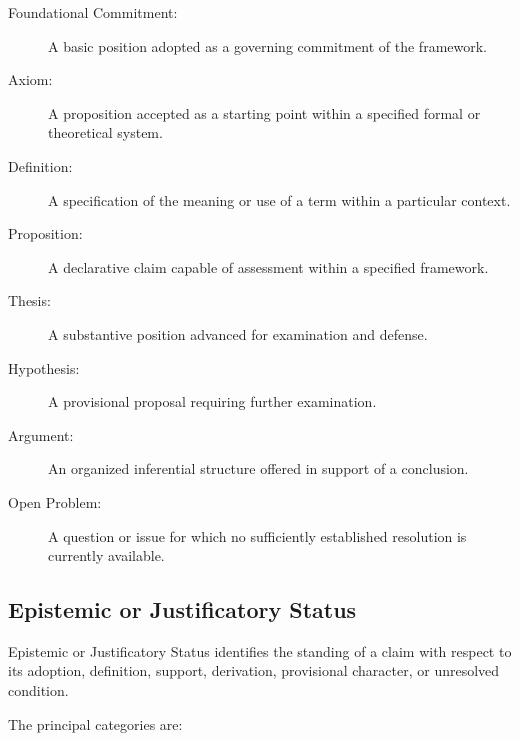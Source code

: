 \begin{description}

    \item[Foundational Commitment:]
    A basic position adopted as a governing commitment of the framework.

    \item[Axiom:]
    A proposition accepted as a starting point within a specified
    formal or theoretical system.

    \item[Definition:]
    A specification of the meaning or use of a term within a
    particular context.

    \item[Proposition:]
    A declarative claim capable of assessment within a specified
    framework.

    \item[Thesis:]
    A substantive position advanced for examination and defense.

    \item[Hypothesis:]
    A provisional proposal requiring further examination.

    \item[Argument:]
    An organized inferential structure offered in support of a conclusion.

    \item[Open Problem:]
    A question or issue for which no sufficiently established
    resolution is currently available.

\end{description}


\subsection*{Epistemic or Justificatory Status}

Epistemic or Justificatory Status identifies the standing of a claim
with respect to its adoption, definition, support, derivation,
provisional character, or unresolved condition.

The principal categories are:

